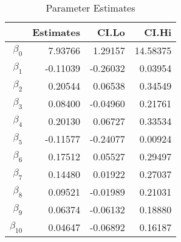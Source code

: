 \begin{table}[ht]
\centering
\caption{Parameter Estimates} 
\begin{tabular}{rrrr}
  \hline
 & Estimates & CI.Lo & CI.Hi \\ 
  \hline
$\beta_{0}$ & 7.93766 & 1.29157 & 14.58375 \\ 
  $\beta_{1}$ & -0.11039 & -0.26032 & 0.03954 \\ 
  $\beta_{2}$ & 0.20544 & 0.06538 & 0.34549 \\ 
  $\beta_{3}$ & 0.08400 & -0.04960 & 0.21761 \\ 
  $\beta_{4}$ & 0.20130 & 0.06727 & 0.33534 \\ 
  $\beta_{5}$ & -0.11577 & -0.24077 & 0.00924 \\ 
  $\beta_{6}$ & 0.17512 & 0.05527 & 0.29497 \\ 
  $\beta_{7}$ & 0.14480 & 0.01922 & 0.27037 \\ 
  $\beta_{8}$ & 0.09521 & -0.01989 & 0.21031 \\ 
  $\beta_{9}$ & 0.06374 & -0.06132 & 0.18880 \\ 
  $\beta_{10}$ & 0.04647 & -0.06892 & 0.16187 \\ 
   \hline
\end{tabular}
\end{table}
